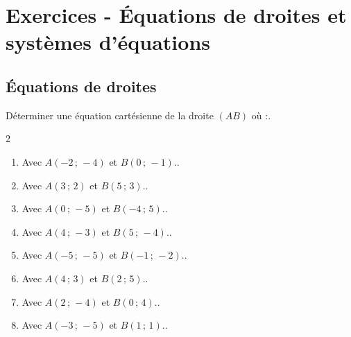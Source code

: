 \section*{Exercices - Équations de droites et systèmes d'équations}
{\setlength{\columnseprule}{0pt}
\setcounter{NumEx}{1}


\subsection*{Équations de droites}

\begin{Exercice}
Déterminer une équation cartésienne de la droite $(AB)$ où :.
\vspace{-0.5cm}
\begin{multicols}{2}
\begin{enumerate}[itemsep=1em]
\item \begin{minipage}[t]{\linewidth} Avec $A(-2\,;\,-4)$ et $B(0\,;\,-1)$.. \end{minipage}
	\item \begin{minipage}[t]{\linewidth} Avec $A(3\,;\,2)$ et $B(5\,;\,3)$.. \end{minipage}
	\item \begin{minipage}[t]{\linewidth} Avec $A(0\,;\,-5)$ et $B(-4\,;\,5)$.. \end{minipage}
	\item \begin{minipage}[t]{\linewidth} Avec $A(4\,;\,-3)$ et $B(5\,;\,-4)$.. \end{minipage}
	\item \begin{minipage}[t]{\linewidth} Avec $A(-5\,;\,-5)$ et $B(-1\,;\,-2)$.. \end{minipage}
	\item \begin{minipage}[t]{\linewidth} Avec $A(4\,;\,3)$ et $B(2\,;\,5)$.. \end{minipage}
	\item \begin{minipage}[t]{\linewidth} Avec $A(2\,;\,-4)$ et $B(0\,;\,4)$.. \end{minipage}
	\item \begin{minipage}[t]{\linewidth} Avec $A(-3\,;\,-5)$ et $B(1\,;\,1)$.. \end{minipage}
\end{enumerate}
\end{multicols}
\end{Exercice}

}
